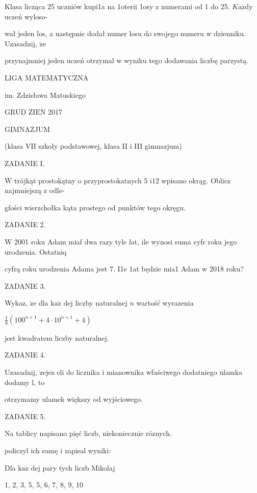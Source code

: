 \documentclass[a4paper,12pt]{article}
\begin{document}
Klasa licząca 25 uczniów kupi1a na 1oterii 1osy z numerami od 1 do 25. $K\mathrm{a}\dot{\mathrm{z}}\mathrm{d}\mathrm{y}$ uczeń wyloso-

wał jeden los, a następnie dodał numer losu do swojego numeru w dzienniku. Uzasadnij, $\dot{\mathrm{z}}\mathrm{e}$

przynajmniej jeden uczeń otrzymal w wyniku tego dodawania liczbę parzystą.






LIGA MATEMATYCZNA

im. Zdzisława Matuskiego

GRUD Z$\mathrm{I}\mathrm{E}\acute{\mathrm{N}}$ 2017

GIMNAZJUM

(klasa VII szkoły podstawowej, klasa II i III gimnazjum)

ZADANIE I.

$\mathrm{W}$ trójkąt prostokątny o przyprostokatnych 5 $\mathrm{i}12$ wpisano okrąg. Oblicz najmniejszą z odle-

gfości wierzchołka kąta prostego od punktów tego okręgu.

ZADANIE 2.

$\mathrm{W}$ 2001 roku Adam miaf dwa razy tyle lat, ile wynosi suma cyfr roku jego urodzenia. Ostatniq

cyfrą roku urodzenia Adama jest 7. I1e 1at będzie mia1 Adam w 2018 roku?

ZADANIE 3.

Wykaz, $\dot{\mathrm{z}}\mathrm{e}$ dla $\mathrm{k}\mathrm{a}\dot{\mathrm{z}}$ dej liczby naturalnej $n$ wartość wyrazenia

$\displaystyle \frac{1}{9}(100^{n+1}+4\cdot 10^{n+1}+4)$

jest kwadratem liczby naturalnej.

ZADANIE 4.

Uzasadnij, $\dot{\mathrm{z}}\mathrm{e}\mathrm{j}\mathrm{e}\dot{\mathrm{z}}$ eli do licznika i mianownika wfaściwego dodatniego ulamka dodamy l, to

otrzymamy ulamek większy od wyjściowego.

ZADANIE 5.

Na tablicy napisano pięć liczb, niekoniecznie róznych.

policzyl ich sumę i zapisal wyniki:

Dla $\mathrm{k}\mathrm{a}\dot{\mathrm{z}}$ dej pary tych liczb Mikolaj

1, 2, 3, 5, 5, 6, 7, 8, 9, 10
\end{document}
